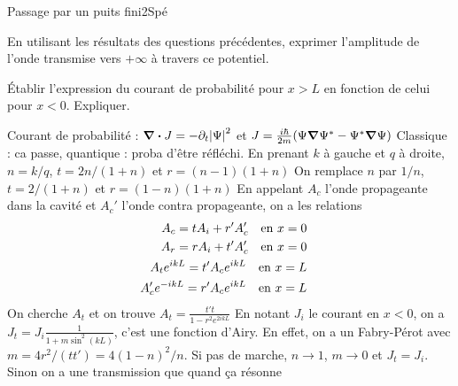 \begin{exercise}{Passage par un puits fini}{2}{Spé}
\begin{questions}
\begin{center}
    
    
    
\end{center}

    \question En utilisant les résultats des questions précédentes, exprimer l'amplitude de l'onde transmise vers $+\infty$ à travers ce potentiel.

    \question Établir l'expression du courant de probabilité pour $x > L$ en fonction de celui pour $x < 0$. Expliquer.
    
\end{questions}



\end{exercise}

\begin{solution}

\begin{questions}
    \questioncours Courant de probabilité : $\div J = -\partial_t \abs{\Psi}^2$ et $J = \frac{i\hbar}{2m}\qty(\Psi\grad\Psi^* - \Psi^* \grad \Psi)$
    \question Classique : ca passe, quantique : proba d'être réfléchi.
    \question En prenant $k$ à gauche et $q$ à droite, $n = k/q$, $t = 2n/(1+n)$ et $r = (n-1)(1+n)$
    \question On remplace $n$ par $1/n$, $t = 2/(1+n)$ et $r = (1-n)(1+n)$
    \question En appelant $A_c$ l'onde propageante dans la cavité et $A_c'$ l'onde contra propageante, on a les relations 
    \begin{align}
        A_c = t A_i + r' A_c' \qqtext{en $x=0$}\\
        A_r = r A_i + t' A_c' \qqtext{en $x=0$} \\
        A_t e^{ikL} = t' A_c e^{ikL} \qqtext{en $x=L$} \\
        A_c' e^{-ikL}= r' A_c e^{ikL} \qqtext{en $x=L$}
    \end{align}
    On cherche $A_t$ et on  trouve $A_t = \frac{t't}{1 - r^2 e^{2ikL}}$
    \question En notant $J_i$ le courant en $x < 0$, on a $J_t = J_i \frac{1}{1 + m\sin^2(kL)}$, c'est une fonction d'Airy. En effet, on a un Fabry-Pérot avec $m = 4r^2/(t t') = 4(1-n)^2/n$. Si pas de marche, $n\rightarrow 1$, $m\rightarrow 0$ et $J_t = J_i$. Sinon on a une transmission que quand ça résonne
\end{questions}
\end{solution}
